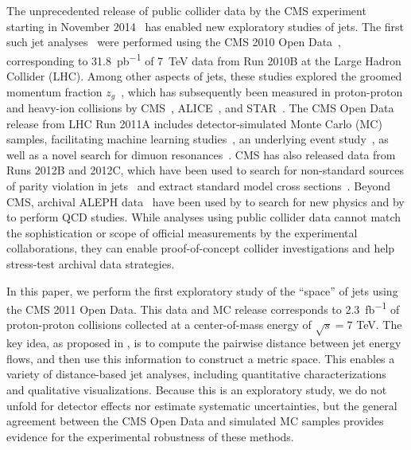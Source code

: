 \documentclass[aps,prd,twocolumn,preprintnumbers,nofootinbib,longbibliography,floatfix,superscriptaddress]{revtex4-1}
\begin{document}
The unprecedented release of public collider data by the CMS experiment~\cite{Chatrchyan:2008aa} starting in November 2014~\cite{CERNOpenDataPortal} has enabled new exploratory studies of jets.
%
The first such jet analyses~\cite{Larkoski:2017bvj,Tripathee:2017ybi} were performed using the CMS 2010 Open Data~\cite{CMS:JetPrimary2010B}, corresponding to \SI{31.8}{pb^{-1}} of \SI{7}{TeV} data from Run 2010B at the Large Hadron Collider (LHC).
%
Among other aspects of jets, these studies explored the groomed momentum fraction $z_g$~\cite{Larkoski:2015lea}, which has subsequently been measured in proton-proton and heavy-ion collisions by CMS~\cite{Sirunyan:2017bsd}, ALICE~\cite{Acharya:2019djg}, and STAR~\cite{Kauder:2017mhg}.
%
The CMS Open Data release from LHC Run 2011A includes detector-simulated Monte Carlo (MC) samples, facilitating machine learning studies~\cite{Madrazo:2017qgh,Andrews:2018nwy,Andrews:2019faz}, an underlying event study~\cite{PaktinatMehdiabadi:2019ujl}, as well as a novel search for dimuon resonances~\cite{Cesarotti:2019nax}.
%
CMS has also released data from Runs 2012B and 2012C, which have been used to search for non-standard sources of parity violation in jets~\cite{Lester:2019bso} and extract standard model cross sections~\cite{Apyan:2019ybx}.
%
Beyond CMS, archival ALEPH data~\cite{ALEPHPreservationPolicy} have been used by  to search for new physics and by  to perform QCD studies.
%
While analyses using public collider data cannot match the sophistication or scope of official measurements by the experimental collaborations, they can enable proof-of-concept collider investigations and help stress-test archival data strategies.


In this paper, we perform the first exploratory study of the ``space'' of jets using the CMS 2011 Open Data.
%
This data and MC release corresponds to \SI{2.3}{{fb}^{-1}} of proton-proton collisions collected at a center-of-mass energy of $\sqrt{s}=7$ TeV.
%
The key idea, as proposed in , is to compute the pairwise distance between jet energy flows, and then use this information to construct a metric space.
%
This enables a variety of distance-based jet analyses, including quantitative characterizations and qualitative visualizations.
%
Because this is an exploratory study, we do not unfold for detector effects nor estimate systematic uncertainties, but the general agreement between the CMS Open Data and simulated MC samples provides evidence for the experimental robustness of these methods.
\end{document}
